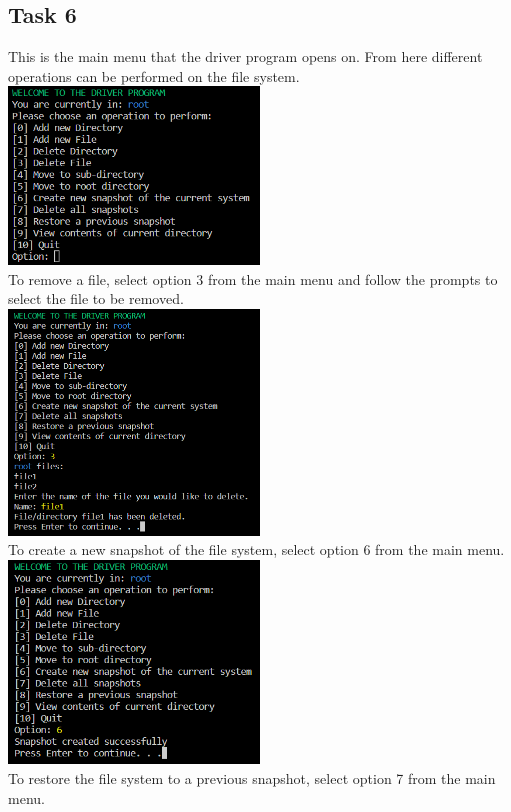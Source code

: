 \documentclass{article}
\begin{document}
\subsection*{Task 6}
This is the main menu that the driver program opens on. From here different operations can 
be performed on the file system.\\
\includegraphics[width=0.5\textwidth]{Task6_1.png}
\\
To remove a file, select option 3 from the main menu and follow the prompts to select the 
file to be removed.\\
\includegraphics[width=0.5\textwidth]{Task6_2.png}
\\
To create a new snapshot of the file system, select option 6 from the main menu.\\
\includegraphics[width=0.5\textwidth]{Task6_3.png}
\\
To restore the file system to a previous snapshot, select option 7 from the main menu.\\
\end{document}
